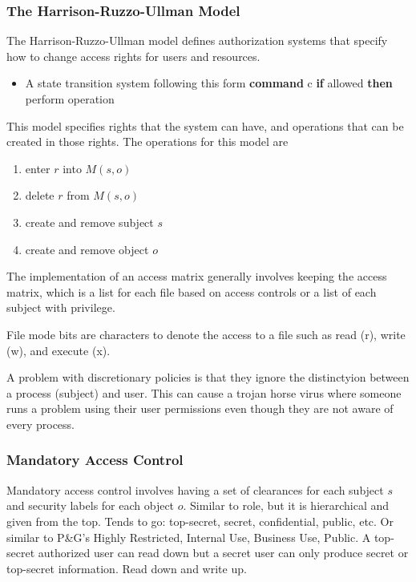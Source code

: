 \documentclass[11pt]{article}
\begin{document}
\subsubsection{The Harrison-Ruzzo-Ullman Model}
The Harrison-Ruzzo-Ullman model defines authorization systems that specify how to change access rights for users and resources.

\begin{itemize}
    \item A state transition system following this form
    \subitem \textbf{command} c
    \subitem \textbf{if} allowed
    \subitem \textbf{then} perform operation
\end{itemize}  
This model specifies rights that the system can have, and operations that can be created in those rights.
The operations for this model are 
\begin{enumerate}
    \item enter $r$ into $M(s,o)$
    \item delete $r$ from $M(s,o)$
    \item create and remove subject $s$
    \item create and remove object $o$
\end{enumerate}

The implementation of an access matrix generally involves keeping the access matrix, which is a list for each file based on access controls or a list of each subject with privilege.

File mode bits are characters to denote the access to a file such as read (r), write (w), and execute (x).

A problem with discretionary policies is that they ignore the distinctyion between a process (subject) and user.
This can cause a trojan horse virus where someone runs a problem using their user permissions even though they are not aware of every process.

\subsubsection{Mandatory Access Control}
Mandatory access control involves having a set of clearances for each subject $s$ and security labels for each object $o$.
Similar to role, but it is hierarchical and given from the top.
Tends to go: top-secret, secret, confidential, public, etc.
Or similar to P\&G's Highly Restricted, Internal Use, Business Use, Public.
A top-secret authorized user can read down but a secret user can only produce secret or top-secret information.
Read down and write up.
\end{document}
